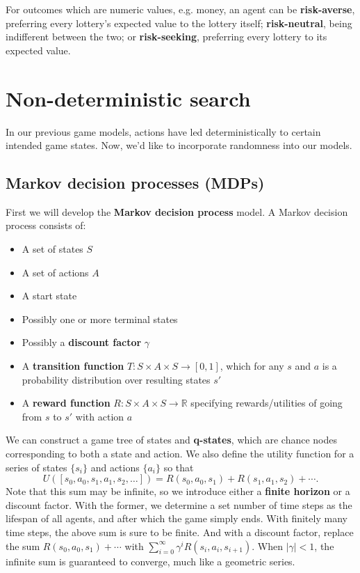 \documentclass[12pt]{article}
\begin{document}
For outcomes which are numeric values, e.g. money, an agent can be \textbf{risk-averse}, preferring every lottery's expected value to the lottery itself; \textbf{risk-neutral}, being indifferent between the two; or \textbf{risk-seeking}, preferring every lottery to its expected value.

\section{Non-deterministic search}

In our previous game models, actions have led deterministically to certain intended game states. Now, we'd like to incorporate randomness into our models.

\subsection{Markov decision processes (MDPs)}

First we will develop the \textbf{Markov decision process} model. A Markov decision process consists of:
\begin{itemize}
\item A set of states $S$
\item A set of actions $A$
\item A start state
\item Possibly one or more terminal states
\item Possibly a \textbf{discount factor} $\gamma$
\item A \textbf{transition function} $T : S \times A \times S \to [0, 1]$, which for any $s$ and $a$ is a probability distribution over resulting states $s'$
\item A \textbf{reward function} $R : S \times A \times S \to \mathbb R$ specifying rewards/utilities of going from $s$ to $s'$ with action $a$
\end{itemize}
We can construct a game tree of states and \textbf{q-states}, which are chance nodes corresponding to both a state and action. We also define the utility function for a series of states $\{s_i\}$ and actions $\{a_i\}$ so that
\[ U(\left[s_0, a_0, s_1, a_1, s_2, \ldots\right]) = R(s_0, a_0, s_1) + R(s_1, a_1, s_2) + \cdots. \]
Note that this sum may be infinite, so we introduce either a \textbf{finite horizon} or a discount factor. With the former, we determine a set number of time steps as the lifespan of all agents, and after which the game simply ends. With finitely many time steps, the above sum is sure to be finite. And with a discount factor, replace the sum $R(s_0, a_0, s_1) + \cdots$ with $\sum_{i = 0}^\infty \gamma^i R(s_i, a_i, s_{i + 1})$. When $|\gamma| < 1$, the infinite sum is guaranteed to converge, much like a geometric series.
\end{document}

